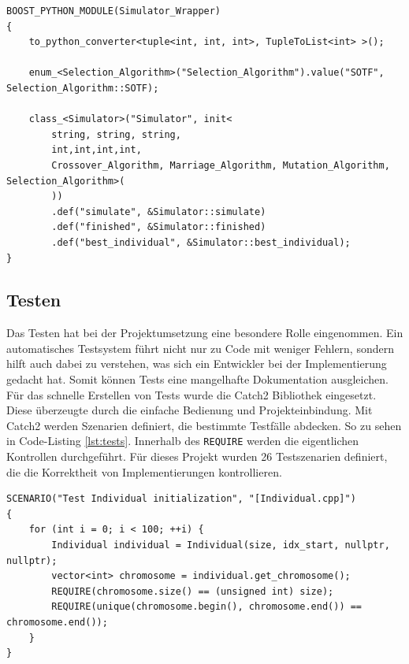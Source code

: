 \begin{minipage}[!htb]{\linewidth}
\begin{lstlisting}[caption={C++ zu Python Schnittstelle}, firstnumber=1, captionpos=b, label=lst:boostpython]
BOOST_PYTHON_MODULE(Simulator_Wrapper)
{
	to_python_converter<tuple<int, int, int>, TupleToList<int> >();

	enum_<Selection_Algorithm>("Selection_Algorithm").value("SOTF", Selection_Algorithm::SOTF);

	class_<Simulator>("Simulator", init<
		string, string, string,
		int,int,int,int,
		Crossover_Algorithm, Marriage_Algorithm, Mutation_Algorithm, Selection_Algorithm>(
		))
 		.def("simulate", &Simulator::simulate)
		.def("finished", &Simulator::finished)
		.def("best_individual", &Simulator::best_individual);
}
\end{lstlisting}
\end{minipage}
\pagebreak
\subsection{Testen}
Das Testen hat bei der Projektumsetzung eine besondere Rolle eingenommen. Ein automatisches Testsystem führt nicht nur zu Code mit weniger Fehlern, sondern hilft auch dabei zu verstehen, was sich ein Entwickler bei der Implementierung gedacht hat. Somit können Tests eine mangelhafte Dokumentation ausgleichen.\\
Für das schnelle Erstellen von Tests wurde die Catch2 Bibliothek eingesetzt. Diese überzeugte durch die einfache Bedienung und Projekteinbindung.
Mit Catch2 werden Szenarien definiert, die bestimmte Testfälle abdecken. So zu sehen in Code-Listing \ref{lst:tests}. Innerhalb des \texttt{REQUIRE} werden die eigentlichen Kontrollen durchgeführt.
Für dieses Projekt wurden 26 Testszenarien definiert, die die Korrektheit von Implementierungen kontrollieren.
\begin{minipage}[!htb]{\linewidth}
\begin{lstlisting}[caption={Unit-Tests}, firstnumber=1, captionpos=b, label=lst:tests]
SCENARIO("Test Individual initialization", "[Individual.cpp]")
{
	for (int i = 0; i < 100; ++i) {
		Individual individual = Individual(size, idx_start, nullptr, nullptr);
		vector<int> chromosome = individual.get_chromosome();
		REQUIRE(chromosome.size() == (unsigned int) size);
		REQUIRE(unique(chromosome.begin(), chromosome.end()) == chromosome.end());
	}
}
\end{lstlisting}
\end{minipage}
